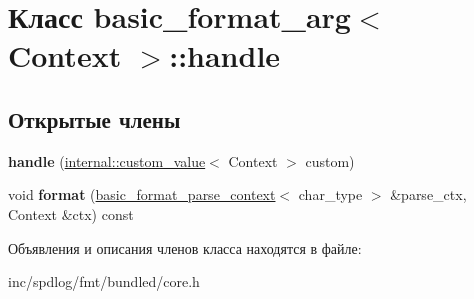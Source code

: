 \hypertarget{classbasic__format__arg_1_1handle}{}\section{Класс basic\+\_\+format\+\_\+arg$<$ Context $>$\+:\+:handle}
\label{classbasic__format__arg_1_1handle}
\subsection*{Открытые члены}
\begin{DoxyCompactItemize}
\item 
\mbox{\label{classbasic__format__arg_1_1handle_ac5d4a1f899cac4ddbff7385e5aa5329b}} 
{\bfseries handle} (\hyperlink{structinternal_1_1custom__value}{internal\+::custom\+\_\+value}$<$ Context $>$ custom)
\item 
\mbox{\label{classbasic__format__arg_1_1handle_aed9bba06f2606747d389b3089463dd87}} 
void {\bfseries format} (\hyperlink{classbasic__format__parse__context}{basic\+\_\+format\+\_\+parse\+\_\+context}$<$ char\+\_\+type $>$ \&parse\+\_\+ctx, Context \&ctx) const
\end{DoxyCompactItemize}


Объявления и описания членов класса находятся в файле\+:\begin{DoxyCompactItemize}
\item 
inc/spdlog/fmt/bundled/core.\+h\end{DoxyCompactItemize}
